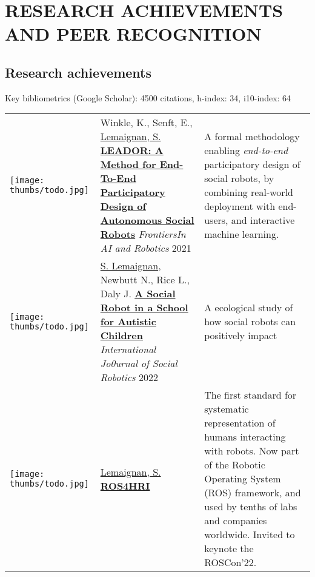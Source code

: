 \section{RESEARCH ACHIEVEMENTS AND PEER RECOGNITION}

\subsection{Research achievements}

Key bibliometrics (Google Scholar): 4500 citations, h-index: 34, i10-index: 64


\hspace*{-0.5cm}\begin{tabular}{p{1.7cm}p{7cm}p{8cm}}

    \vspace{-0.2cm}\texttt{[image: thumbs/todo.jpg]} &
    Winkle, K., Senft, E., \ul{Lemaignan, S.}
    \newline\href{}{\textbf{LEADOR: A Method for End-To-End Participatory Design of Autonomous Social Robots}}
    \newline \textit{FrontiersIn AI and Robotics} 2021
    & \small A formal methodology enabling \emph{end-to-end} participatory
    design of social robots, by combining real-world deployment with end-users,
    and interactive machine learning.\textbf{} \\

    \vspace{-0.2cm}\texttt{[image: thumbs/todo.jpg]} &
    \ul{S. Lemaignan}, Newbutt N., Rice L., Daly J.
    \newline\href{https://doi.org/10.1007/s12369-022-00928-4}{\textbf{A Social Robot in a School for Autistic Children}}
    \newline \textit{International Jo0urnal of Social Robotics} 2022
    & \small A ecological study of how social robots can positively impact \textbf{} \\






    \vspace{-0.2cm}\texttt{[image: thumbs/todo.jpg]} &
    \ul{Lemaignan, S.}
    \newline\href{https://wiki.ros.org/hri}{\textbf{ROS4HRI}}
    \newline 2022
    & \small The first standard for systematic representation of humans
    interacting with robots. Now part of the Robotic Operating System (ROS)
    framework, and used by tenths of labs and companies worldwide. Invited to
    keynote the ROSCon'22. \textbf{} \\



\end{tabular}
